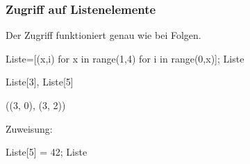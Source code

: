 \documentclass[fontsize=12pt,paper=a4,twoside,bibtotoc,idxtotoc,
liststotoc,pagesize,BCOR1.2cm,DIV15,chapterprefix,pagesize=pdftex]{scrbook}
\theoremstyle{plain}
\theoremstyle{definition}
\theoremstyle{remark}
\begin{document}
\subsubsection{Zugriff auf Listenelemente}
Der Zugriff funktioniert genau wie bei Folgen.
\begin{sagein}
Liste=[(x,i) for x in range(1,4) for i in range(0,x)];  Liste
\end{sagein}
\begin{sageout}
[(1, 0), (2, 0), (2, 1), (3, 0), (3, 1), (3, 2)]
\end{sageout}
\begin{sagein}
Liste[3], Liste[5]
\end{sagein}
\begin{sageout}
((3, 0), (3, 2))
\end{sageout}
 Zuweisung:
\begin{sagein}
Liste[5] = 42; Liste
\end{sagein}
\begin{sageout}
  [(1, 0), (2, 0), (2, 1), (3, 0), (3, 1), 42]
\end{sageout}
\end{document}
